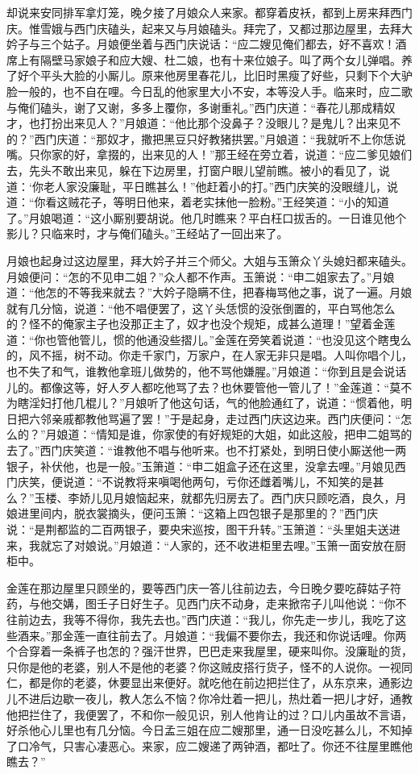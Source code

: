 却说来安同排军拿灯笼，晚夕接了月娘众人来家。都穿着皮袄，都到上房来拜西门庆。惟雪娥与西门庆磕头，起来又与月娘磕头。拜完了，又都过那边屋里，去拜大妗子与三个姑子。月娘便坐着与西门庆说话：“应二嫂见俺们都去，好不喜欢！酒席上有隔壁马家娘子和应大嫂、杜二娘，也有十来位娘子。叫了两个女儿弹唱。养了好个平头大脸的小厮儿。原来他房里春花儿，比旧时黑瘦了好些，只剩下个大驴脸一般的，也不自在哩。今日乱的他家里大小不安，本等没人手。临来时，应二歌与俺们磕头，谢了又谢，多多上覆你，多谢重礼。”西门庆道：“春花儿那成精奴才，也打扮出来见人？”月娘道：“他比那个没鼻子？没眼儿？是鬼儿？出来见不的？”西门庆道：“那奴才，撒把黑豆只好教猪拱罢。”月娘道：“我就听不上你恁说嘴。只你家的好，拿掇的，出来见的人！”那王经在旁立着，说道：“应二爹见娘们去，先头不敢出来见，躲在下边房里，打窗户眼儿望前瞧。被小的看见了，说道：‘你老人家没廉耻，平日瞧甚么！”他赶着小的打。”西门庆笑的没眼缝儿，说道：“你看这贼花子，等明日他来，着老实抹他一脸粉。”王经笑道：“小的知道了。”月娘喝道：“这小厮别要胡说。他几时瞧来？平白枉口拔舌的。一日谁见他个影儿？只临来时，才与俺们磕头。”王经站了一回出来了。

月娘也起身过这边屋里，拜大妗子并三个师父。大姐与玉箫众丫头媳妇都来磕头。月娘便问：“怎的不见申二姐？”众人都不作声。玉箫说：“申二姐家去了。”月娘道：“他怎的不等我来就去？”大妗子隐瞒不住，把春梅骂他之事，说了一遍。月娘就有几分恼，说道：“他不唱便罢了，这丫头恁惯的没张倒置的，平白骂他怎么的？怪不的俺家主子也没那正主了，奴才也没个规矩，成甚么道理！”望着金莲道：“你也管他管儿，惯的他通没些摺儿。”金莲在旁笑着说道：“也没见这个瞎曳么的，风不摇，树不动。你走千家门，万家户，在人家无非只是唱。人叫你唱个儿，也不失了和气，谁教他拿班儿做势的，他不骂他嫌腥。”月娘道：“你到且是会说话儿的。都像这等，好人歹人都吃他骂了去？也休要管他一管儿了！”金莲道：“莫不为瞎淫妇打他几棍儿？”月娘听了他这句话，气的他脸通红了，说道：“惯着他，明日把六邻亲戚都教他骂遍了罢！”于是起身，走过西门庆这边来。西门庆便问：“怎么的？”月娘道：“情知是谁，你家使的有好规矩的大姐，如此这般，把申二姐骂的去了。”西门庆笑道：“谁教他不唱与他听来。也不打紧处，到明日使小厮送他一两银子，补伏他，也是一般。”玉箫道：“申二姐盒子还在这里，没拿去哩。”月娘见西门庆笑，便说道：“不说教将来嗔喝他两句，亏你还雌着嘴儿，不知笑的是甚么？”玉楼、李娇儿见月娘恼起来，就都先归房去了。西门庆只顾吃酒，良久，月娘进里间内，脱衣裳摘头，便问玉箫：“这箱上四包银子是那里的？”西门庆说：“是荆都监的二百两银子，要央宋巡按，图干升转。”玉箫道：“头里姐夫送进来，我就忘了对娘说。”月娘道：“人家的，还不收进柜里去哩。”玉箫一面安放在厨柜中。

金莲在那边屋里只顾坐的，要等西门庆一答儿往前边去，今日晚夕要吃薛姑子符药，与他交媾，图壬子日好生子。见西门庆不动身，走来掀帘子儿叫他说：“你不往前边去，我等不得你，我先去也。”西门庆道：“我儿，你先走一步儿，我吃了这些酒来。”那金莲一直往前去了。月娘道：“我偏不要你去，我还和你说话哩。你两个合穿着一条裤子也怎的？强汗世界，巴巴走来我屋里，硬来叫你。没廉耻的货，只你是他的老婆，别人不是他的老婆？你这贼皮搭行货子，怪不的人说你。一视同仁，都是你的老婆，休要显出来便好。就吃他在前边把拦住了，从东京来，通影边儿不进后边歇一夜儿，教人怎么不恼？你冷灶着一把儿，热灶着一把儿才好，通教他把拦住了，我便罢了，不和你一般见识，别人他肯让的过？口儿内虽故不言语，好杀他心儿里也有几分恼。今日孟三姐在应二嫂那里，通一日没吃甚么儿，不知掉了口冷气，只害心凄恶心。来家，应二嫂递了两钟酒，都吐了。你还不往屋里瞧他瞧去？”

